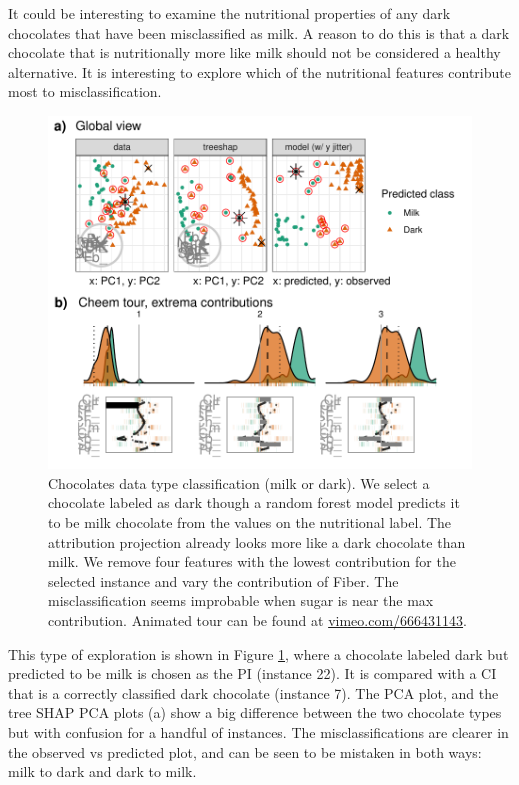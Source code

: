 \documentclass[
]{article}
\begin{document}
It could be interesting to examine the nutritional properties of any dark chocolates that have been misclassified as milk. A reason to do this is that a dark chocolate that is nutritionally more like milk should not be considered a healthy alternative. It is interesting to explore which of the nutritional features contribute most to misclassification.



\begin{figure}

{\centering \includegraphics[width=1\linewidth]{./figures/case_chocolates} 

}

\caption{Chocolates data type classification (milk or dark). We select a chocolate labeled as dark though a random forest model predicts it to be milk chocolate from the values on the nutritional label. The attribution projection already looks more like a dark chocolate than milk. We remove four features with the lowest contribution for the selected instance and vary the contribution of Fiber. The misclassification seems improbable when sugar is near the max contribution. Animated tour can be found at \href{https://vimeo.com/666431143}{vimeo.com/666431143}.}\label{fig:casechocolates}
\end{figure}

This type of exploration is shown in Figure \ref{fig:casechocolates}, where a chocolate labeled dark but predicted to be milk is chosen as the PI (instance 22). It is compared with a CI that is a correctly classified dark chocolate (instance 7). The PCA plot, and the tree SHAP PCA plots (a) show a big difference between the two chocolate types but with confusion for a handful of instances. The misclassifications are clearer in the observed vs predicted plot, and can be seen to be mistaken in both ways: milk to dark and dark to milk.
\end{document}
